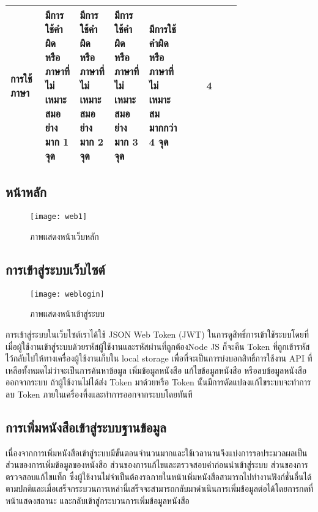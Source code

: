 \begin{table}[H]
\begin{tabular}{|p{0.15\linewidth}|p{0.15\linewidth}|p{0.15\linewidth}|p{0.15\linewidth}|p{0.15\linewidth}|c|}
การใช้ภาษา           & มีการใช้คำผิดหรือภาษาที่ไม่เหมาะสมอย่างมาก   1 จุด                                                               &  มีการใช้คำผิดหรือภาษาที่ไม่เหมาะสมอย่างมาก   2 จุด                                                &มีการใช้คำผิดหรือภาษาที่ไม่เหมาะสมอย่างมาก 3 จุด                                                                 & มีการใช้คำผิดหรือภาษาที่ไม่เหมาะสมมากกว่า 4 จุด                                               & 4           \\ \hline
\end{tabular}
\end{table}

\subsection{หน้าหลัก}
\begin{figure}[H]
    \centering
    \texttt{[image: web1]}
    \caption{ภาพแสดงหน้าเว็บหลัก}\label{fig:web1}
\end{figure}

\subsection{การเข้าสู่ระบบเว็บไซต์}
\begin{figure}[H]
    \centering
    \texttt{[image: weblogin]}
    \caption{ภาพแสดงหน้าเข้าสู่ระบบ}\label{fig:weblogin}
\end{figure}
การเข้าสู่ระบบในเว็บไซต์เราได้ใช้ JSON Web Token (JWT) ในการดูสิทธิ์การเข้าใช้ระบบโดยที่เมื่อผู้ใช้งานเข้าสู่ระบบด้วยรหัสผู้ใช้งานและรหัสผ่านที่ถูกต้องNode JS ก็จะคืน Token ที่ถูกเข้ารหัสไว้กลับไปให้ทางเครื่องผู้ใช้งานเก็บใน local storage เพื่อที่จะเป็นการบ่งบอกสิทธิ์การใช้งาน API ที่เหลือทั้งหมดไม่ว่าจะเป็นการค้นหาข้อมูล เพิ่มข้อมูลหนังสือ แก้ไขข้อมูลหนังสือ หรือลบข้อมูลหนังสือออกจากระบบ ถ้าผู้ใช้งานไม่ได้ส่ง Token มาด้วยหรือ Token นั้นมีการดัดแปลงแก้ไขระบบจะทำการลบ Token ภายในเครื่องทึ้งและทำการออกจากระบบโดยทันที

\subsection{การเพิ่มหนังสือเข้าสู่ระบบฐานข้อมูล}
เนื่องจากการเพิ่มหนังสือเข้าสู่ระบบมีขั้นตอนจำนวนมากและใช้เวลานานจึงแบ่งการรอประมวลผลเป็นส่วนของการเพิ่มข้อมูลของหนังสือ ส่วนของการแก้ไขและตรวจสอบคำก่อนนำเข้าสู่ระบบ ส่วนของการตรวจสอบแก้ไขแท็ก ซึ่งผู้ใช้งานไม่จำเป็นต้องรอภายในหน้าเพิ่มหนังสือสามารถไปทำงานฟังก์ชั่นอื่นได้ตามปกติและเมื่อเสร็จกระบวนการเหล่านี้เสร็จจะสามารถกลับมาดำเนินการเพิ่มข้อมูลต่อได้โดยการกดที่หน้าแสดงสถานะ และกลับเข้าสู่กระบวนการเพิ่มข้อมูลหนังสือ
